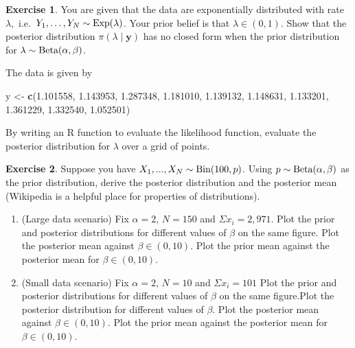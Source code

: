\documentclass[
]{book}
\newenvironment{Shaded}{\begin{snugshade}}{\end{snugshade}}
\newcommand{\FloatTok}[1]{\textcolor[rgb]{0.00,0.00,0.81}{#1}}
\newcommand{\FunctionTok}[1]{\textcolor[rgb]{0.13,0.29,0.53}{\textbf{#1}}}
\newcommand{\NormalTok}[1]{#1}
\newcommand{\OtherTok}[1]{\textcolor[rgb]{0.56,0.35,0.01}{#1}}
\providecommand{\tightlist}{%
  \setlength{\itemsep}{0pt}\setlength{\parskip}{0pt}}
\theoremstyle{definition}
\theoremstyle{definition}
\theoremstyle{definition}
\newtheorem{exercise}{Exercise}[chapter]
\theoremstyle{definition}
\theoremstyle{remark}
\begin{document}
\begin{exercise}

You are given that the data are exponentially distributed with rate \(\lambda,\) i.e.~\(Y_1, \ldots, Y_N \sim \hbox{Exp}(\lambda)\). Your prior belief is that \(\lambda \in (0, 1)\). Show that the posterior distribution \(\pi(\lambda \mid \boldsymbol{y})\) has no closed form when the prior distribution for \(\lambda \sim \hbox{Beta}(\alpha, \beta)\).

The data is given by

\begin{Shaded}
\begin{Highlighting}[]
\NormalTok{y }\OtherTok{\textless{}{-}} \FunctionTok{c}\NormalTok{(}\FloatTok{1.101558}\NormalTok{, }\FloatTok{1.143953}\NormalTok{, }\FloatTok{1.287348}\NormalTok{, }\FloatTok{1.181010}\NormalTok{, }\FloatTok{1.139132}\NormalTok{, }\FloatTok{1.148631}\NormalTok{, }\FloatTok{1.133201}\NormalTok{, }\FloatTok{1.361229}\NormalTok{, }\FloatTok{1.332540}\NormalTok{, }\FloatTok{1.052501}\NormalTok{)}
\end{Highlighting}
\end{Shaded}

\end{exercise}

By writing an R function to evaluate the likelihood function, evaluate the posterior distribution for \(\lambda\) over a grid of points.

\begin{exercise}

Suppose you have \(X_1, ..., X_N \sim \hbox{Bin}(100, p)\). Using \(p \sim \hbox{Beta}(\alpha, \beta)\) as the prior distribution, derive the posterior distribution and the posterior mean (Wikipedia is a helpful place for properties of distributions).

\begin{enumerate}
\def\labelenumi{\arabic{enumi}.}
\tightlist
\item
  (Large data scenario) Fix \(\alpha = 2\), \(N = 150\) and \(\Sigma x_i = 2,971\). Plot the prior and posterior distributions for different values of \(\beta\) on the same figure. Plot the posterior mean against \(\beta \in (0, 10)\). Plot the prior mean against the posterior mean for \(\beta \in (0, 10)\).
\item
  (Small data scenario) Fix \(\alpha = 2\), \(N = 10\) and \(\Sigma x_i = 101\) Plot the prior and posterior distributions for different values of \(\beta\) on the same figure.Plot the posterior distribution for different values of \(\beta\). Plot the posterior mean against \(\beta \in (0, 10)\). Plot the prior mean against the posterior mean for \(\beta \in (0, 10)\).
\end{enumerate}

\end{exercise}
\end{document}

